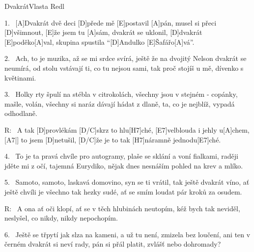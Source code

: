 \begin{song}{Dvakrát}{Vlasta Redl}

\begin{xverse}{1.~}
[\large A]Dvakrát dvě deci [\large D]přede mě [\large E]postavil [\large A]pán,
musel si přeci [\large D]všimnout, [\large E]{že} jsem tu [\large A]sám,
dvakrát se uklonil, [\large D]dvakrát [\large E]poděko[\large A]val,
skupina spustila ``[\large D]Andulko [\large E]{Ša}fářo[\large A]vá''.
\end{xverse}

\begin{xverse}{2.~}
Ach, to je muzika, až se mi srdce svírá,
ještě že na dvojitý Nelson dvakrát se neumírá,
od stolu vstávají ti, co tu nejsou sami,
tak proč stojíš u mě, dívenko s květinami.
\end{xverse}

\begin{xverse}{3.~}
Holky rty špulí na stébla v citrokolách,
všechny jsou v stejném - copánky, mašle, volán,
všechny si naráz dávají hádat z dlaně,
ta, co je nejblíž, vypadá odhodlaně.
\end{xverse}

\begin{xverse}{R:~}
A tak [\large D]provlékám [\large D/C]skrz to hlu[\large H7]ché,
[\large E7]velblouda i jehly u[\large A]chem, [\large A7|]{}
to jsem [\large D]netušil, [\large D/C]{že} je to tak
[\large H7]náramně jednodu[\large E7]ché.
\end{xverse}

\begin{xverse}{4.~}
To je ta pravá chvíle pro autogramy,
plaše se sklání a voní fialkami,
raději jděte mi z očí, tajemná Eurydiko,
nějak dnes nesnáším pohled na krev a mlíko.
\end{xverse}

\begin{xverse}{5.~}
Samoto, samoto, laskavá domovino,
syn se ti vrátil, tak ještě dvakrát víno,
ať ještě chvíli je všechno tak hezky sudé,
ať se smím loudat pár kroků za osudem.
\end{xverse}

\begin{xverse}{R:~}
A ona ať oči klopí,
ať se v těch hlubinách neutopím,
kéž bych tak neviděl, neslyšel,
co nikdy, nikdy nepochopím.
\end{xverse}

\begin{xverse}{6.~}
Ještě se třpytí jak slza na kameni,
a už tu není, zmizela bez loučení,
ani ten v černém dvakrát si neví rady,
pán si přál platit, zvlášť nebo dohromady?
\end{xverse}

\end{song}


